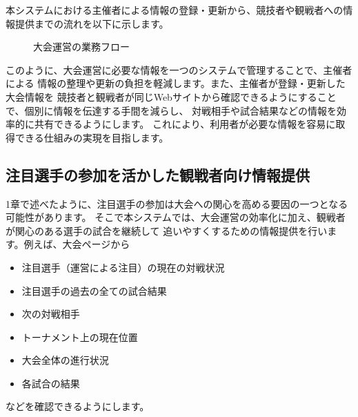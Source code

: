 本システムにおける主催者による情報の登録・更新から、競技者や観戦者への情報提供までの流れを以下に示します。

\begin{figure}[H]
  \centering
  \caption{大会運営の業務フロー}
  \label{fig:flow}
\end{figure}

このように、大会運営に必要な情報を一つのシステムで管理することで、主催者による
情報の整理や更新の負担を軽減します。また、主催者が登録・更新した大会情報を
競技者と観戦者が同じWebサイトから確認できるようにすることで、個別に情報を伝達する手間を減らし、
対戦相手や試合結果などの情報を効率的に共有できるようにします。
これにより、利用者が必要な情報を容易に取得できる仕組みの実現を目指します。

\subsection{注目選手の参加を活かした観戦者向け情報提供}

1章で述べたように、注目選手の参加は大会への関心を高める要因の一つとなる可能性があります。
そこで本システムでは、大会運営の効率化に加え、観戦者が関心のある選手の試合を継続して
追いやすくするための情報提供を行います。例えば、大会ページから

\begin{itemize}
  \item 注目選手（運営による注目）の現在の対戦状況
  \item 注目選手の過去の全ての試合結果
  \item 次の対戦相手
  \item トーナメント上の現在位置
  \item 大会全体の進行状況
  \item 各試合の結果
\end{itemize}
などを確認できるようにします。

